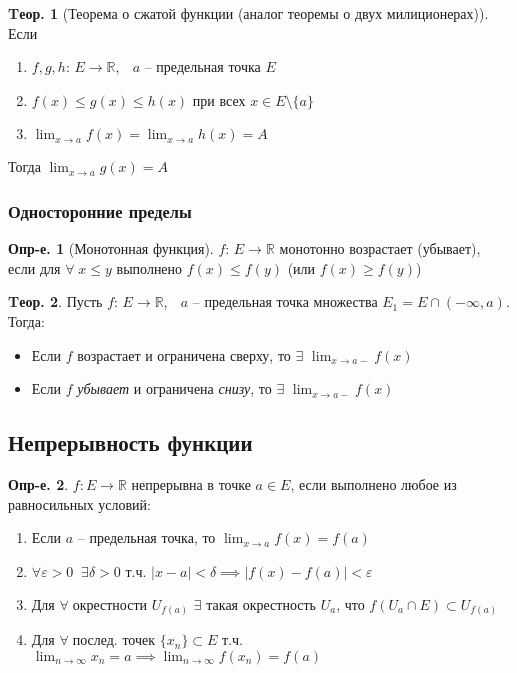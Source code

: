 \documentclass[a4paper,12pt]{article}
\numberwithin{figure}{section}
\theoremstyle{definition}
\newtheorem{definition}{Опр-е.}[section]
\theoremstyle{definition}
\newtheorem{theorem}{Tеор.}[section]
\def\DS{\displaystyle}
\def\RR{\mathbb{R}}
\def\.{\;\;}
\def\on{\!:}
\def\eps{\varepsilon}
\def\ntoinf{n\to\infty}
\def\leqs{\leqslant}
\def\geqs{\geqslant}
\def\any{$\forall\;$}
\begin{document}
\begin{theorem}[Теорема о сжатой функции (аналог теоремы о двух милиционерах)]
  Если \begin{enumerate}
	\item $f,g,h :\, E\to\RR$, $\;$ $a$ -- предельная точка $E$
	\item $f(x) \leqs g(x) \leqs h(x)$ при всех $x \in E \setminus \{a\}$
	\item $\DS \lim_{x\to a}f(x)=\lim_{x\to a}h(x)=A$
  \end{enumerate}
  Тогда $\DS \lim_{x\to a}g(x)=A$
\end{theorem}

\subsubsection{Односторонние пределы}

\begin{definition}[Монотонная функция]
	$f :\, E\to\RR$ монотонно возрастает (убывает), если для \any $x \leqs y$
	выполнено $f(x) \leqs f(y)$ \big(или $f(x) \geqs f(y)$\big)
\end{definition}


\begin{theorem}
	Пусть $f:\, E\to\RR$, $\;$ $a$ -- предельная точка множества $E_1=E \cap (-\infty,a)$.
	Тогда: \begin{itemize}
		\item Если $f$ возрастает и ограничена сверху, то
			  $\exists$ $\DS \lim_{x\to a-}f(x)$
		\item Если $f$ \textit{убывает} и ограничена \textit{снизу}, то
			  $\exists$ $\DS \lim_{x\to a-}f(x)$
	\end{itemize}
\end{theorem}


\subsection{Непрерывность функции}

\begin{definition}
  $f\on E\to\RR$ непрерывна в точке $a \in E$,
  если выполнено любое из равносильных условий:
  \begin{enumerate}
	\item Если $a$ -- предельная точка, то $\DS \lim_{x\to a}f(x)=f(a)$
	\item $\DS \forall\eps>0 \. \exists\delta>0 \text{ т.ч. }
		   |x-a|<\delta \implies |f(x)-f(a)|<\eps$
	\item Для \any окрестности $U_{f(a)}$ $\exists$ такая окрестность $U_a$,
		  что $f(U_a \cap E) \subset U_{f(a)}$
	\item Для \any послед. точек $\{x_n\} \subset E$ т.ч.
		  $\DS \lim_{\ntoinf}x_n=a \implies \lim_{\ntoinf}f(x_n)=f(a)$
  \end{enumerate}
\end{definition}
\bigskip
\end{document}

